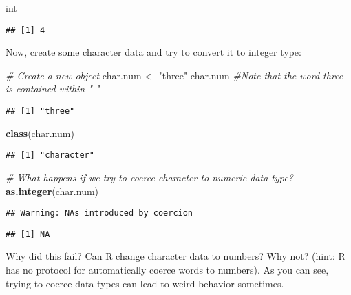 \documentclass[]{article}
\newenvironment{Shaded}{\begin{snugshade}}{\end{snugshade}}
\newcommand{\KeywordTok}[1]{\textcolor[rgb]{0.13,0.29,0.53}{\textbf{#1}}}
\newcommand{\StringTok}[1]{\textcolor[rgb]{0.31,0.60,0.02}{#1}}
\newcommand{\CommentTok}[1]{\textcolor[rgb]{0.56,0.35,0.01}{\textit{#1}}}
\newcommand{\NormalTok}[1]{#1}
\begin{document}
\begin{Shaded}
\begin{Highlighting}[]
\NormalTok{int}
\end{Highlighting}
\end{Shaded}

\begin{verbatim}
## [1] 4
\end{verbatim}

Now, create some character data and try to convert it to integer type:

\begin{Shaded}
\begin{Highlighting}[]
\CommentTok{# Create a new object}
\NormalTok{char.num <-}\StringTok{ "three"}
\NormalTok{char.num   }\CommentTok{#Note that the word three is contained within " " }
\end{Highlighting}
\end{Shaded}

\begin{verbatim}
## [1] "three"
\end{verbatim}

\begin{Shaded}
\begin{Highlighting}[]
\KeywordTok{class}\NormalTok{(char.num)}
\end{Highlighting}
\end{Shaded}

\begin{verbatim}
## [1] "character"
\end{verbatim}

\begin{Shaded}
\begin{Highlighting}[]
\CommentTok{# What happens if we try to coerce character to numeric data type? }
\KeywordTok{as.integer}\NormalTok{(char.num)}
\end{Highlighting}
\end{Shaded}

\begin{verbatim}
## Warning: NAs introduced by coercion
\end{verbatim}

\begin{verbatim}
## [1] NA
\end{verbatim}

Why did this fail? Can R change character data to numbers? Why not?
(hint: R has no protocol for automatically coerce words to numbers). As
you can see, trying to coerce data types can lead to weird behavior
sometimes.
\end{document}
